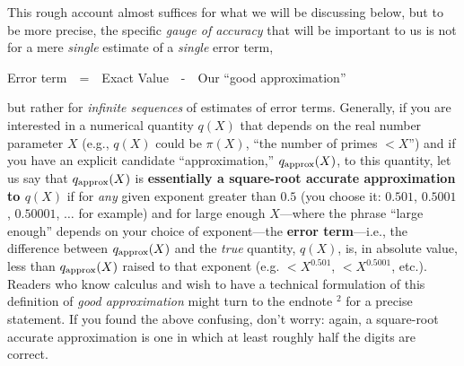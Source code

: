 \documentclass[openany]{book}
\theoremstyle{plain}
\theoremstyle{definition}
\begin{document}
This rough account almost suffices for what we will be discussing
below, but to be more precise, the specific {\em gauge of accuracy}
that will be important to us is not for a mere {\em single} estimate
of a {\em single} error term,

 \centerline{Error term\ \  =\ \    Exact Value\ \   -\ \   Our ``good  approximation''}



 \noindent but rather for {\em infinite sequences} of estimates of
 error terms. Generally, if you are interested in a numerical quantity
 $q(X)$ that depends on the real number parameter $X$ (e.g., $q(X)$
 could be $\pi(X)$, ``the number of primes $< X$'') and if you have an
 explicit candidate ``approximation,'' $q_{\rm approx}(X)$, to this
 quantity, let us say that $q_{\rm approx}(X)$ is {\bf essentially a
   square-root accurate approximation to $q(X)$} if for {\em any}
 given exponent greater than $0.5$ (you choose it: $0.501$, $0.5001$,
 $0.50001$, $\dots$ for example) and for large enough $X$---where the
 phrase ``large enough'' depends on your choice of exponent---the {\bf
   error term}---i.e., the difference between $q_{\rm approx}(X)$ and
 the {\em true} quantity, $q(X)$, is, in absolute value, less than
 $q_{\rm approx}(X)$ raised to that exponent (e.g. $< X^{0.501}$, $<
 X^{0.5001}$, etc.). Readers who know calculus and wish to have a
 technical formulation of this definition of {\em good approximation}
 might turn to the endnote $^2$ for a precise statement.
If you found the above confusing, don't worry: again, a
square-root accurate approximation is one in which at least roughly
half the digits are correct.
\end{document}
